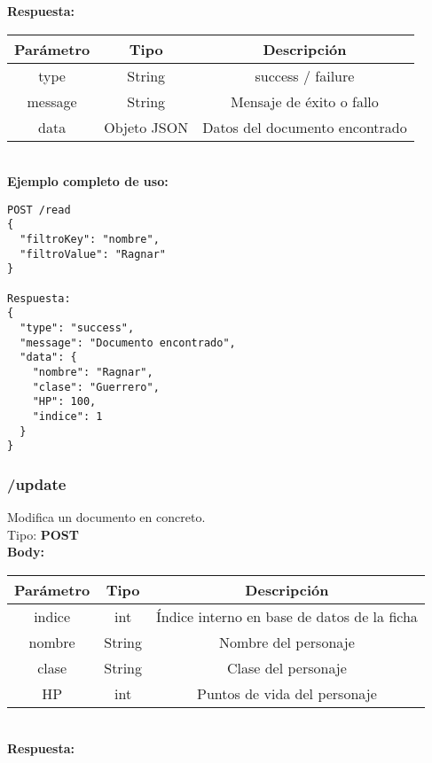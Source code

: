 \documentclass[a4paper,12pt]{article}
\begin{document}
\textbf{Respuesta:}\\

\begin{tabular}{|c|c|c|}
    \hline
    \textbf{Parámetro} & \textbf{Tipo}  & \textbf{Descripción}\\ 
    \hline
    type & String & success / failure\\ 
    \hline
    message & String & Mensaje de éxito o fallo\\ 
    \hline
    data & Objeto JSON & Datos del documento encontrado\\ 
    \hline
\end{tabular}\\[1em]

\textbf{Ejemplo completo de uso:}
\begin{verbatim}
POST /read
{
  "filtroKey": "nombre",
  "filtroValue": "Ragnar"
}

Respuesta:
{
  "type": "success",
  "message": "Documento encontrado",
  "data": {
    "nombre": "Ragnar",
    "clase": "Guerrero",
    "HP": 100,
    "indice": 1
  }
}
\end{verbatim}

\FloatBarrier
\subsubsection{/update}
Modifica un documento en concreto.\\

Tipo: \textbf{POST}\\[0.5em]

\textbf{Body:}\\

\begin{tabular}{|c|c|c|}
    \hline
    \textbf{Parámetro} & \textbf{Tipo}  & \textbf{Descripción}\\ 
    \hline
    indice & int & Índice interno en base de datos de la ficha\\ 
    \hline
    nombre & String & Nombre del personaje\\ 
    \hline
    clase & String & Clase del personaje\\ 
    \hline
    HP & int & Puntos de vida del personaje\\ 
    \hline
\end{tabular}\\[1em]

\textbf{Respuesta:}\\
\end{document}
